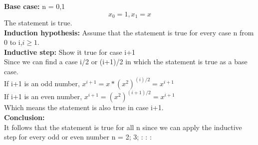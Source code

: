 \documentclass{article}
\begin{document}
\textbf{Base case:} n = 0,1\\
$$x_0=1,x_1=x$$
The statement is true.\\
\textbf{Induction hypothesis:} Assume that the statement is true for every case n from 0 to i,$i \ge 1$.\\
\textbf{Inductive step:} Show it true for case i+1\\
Since we can find a case i/2 or (i+1)/2 in which the statement is true as a base case.\\
If i+1 is an odd number, $x^{i+1}=x*{(x^2)}^{(i)/2}=x^{i+1}$\\
If i+1 is an even number, $x^{i+1}={(x^2)}^{(i+1)/2}=x^{i+1}$\\
Which means the statement is also true in case i+1.\\
\textbf{Conclusion:}\\
It follows that the statement is true for all n since we can apply the inductive step for every odd or even number n = 2; 3; : : :
\end{document}
